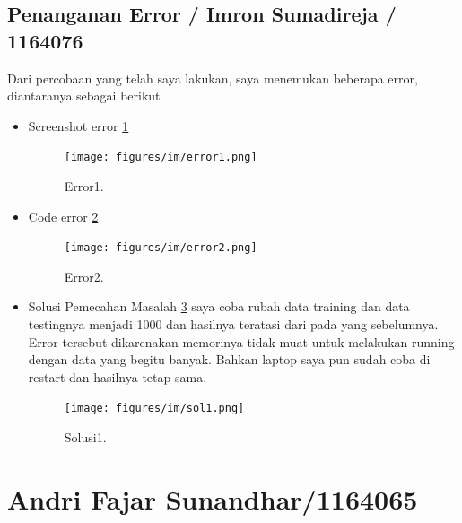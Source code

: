 \subsection{Penanganan Error / Imron Sumadireja / 1164076}
Dari percobaan yang telah saya lakukan, saya menemukan beberapa error, diantaranya sebagai berikut
\begin{itemize}
\item Screenshot error \ref{error1}
 		\begin{figure}[ht]
		\centerline{\texttt{[image: figures/im/error1.png]}}
		\caption{Error1.}
		\label{error1}
		\end{figure}

\item Code error \ref{error2}
 		\begin{figure}[ht]
		\centerline{\texttt{[image: figures/im/error2.png]}}
		\caption{Error2.}
		\label{error2}
		\end{figure}

\item Solusi Pemecahan Masalah \ref{sol1} saya coba rubah data training dan data testingnya menjadi 1000 dan hasilnya teratasi dari pada yang sebelumnya. Error tersebut dikarenakan memorinya tidak muat untuk melakukan running dengan data yang begitu banyak. Bahkan laptop saya pun sudah coba di restart dan hasilnya tetap sama.
 		\begin{figure}[ht]
		\centerline{\texttt{[image: figures/im/sol1.png]}}
		\caption{Solusi1.}
		\label{sol1}
		\end{figure}

\end{itemize}


\section{Andri Fajar Sunandhar/1164065}
